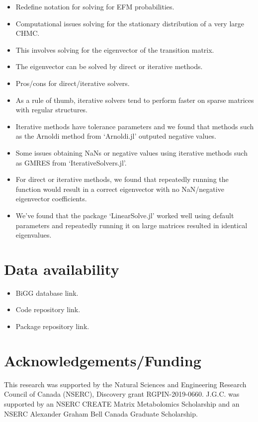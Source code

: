 \documentclass[11pt]{article}
\begin{document}
\begin{itemize}
    \item Redefine notation for solving for EFM probabilities.
    \item Computational issues solving for the stationary distribution of a very large CHMC.
    \item This involves solving for the eigenvector of the transition matrix.
    \item The eigenvector can be solved by direct or iterative methods.
    \item Pros/cons for direct/iterative solvers.
    \item As a rule of thumb, iterative solvers tend to perform faster on sparse matrices with regular structures.
    \item Iterative methods have tolerance parameters and we found that methods such as the Arnoldi method from `Arnoldi.jl' outputed negative values.
    \item Some issues obtaining NaNs or negative values using iterative methods such as GMRES from `IterativeSolvers.jl'.
    \item For direct or iterative methods, we found that repeatedly running the function would result in a correct eigenvector with no NaN/negative eigenvector coefficients.
    \item We've found that the package `LinearSolve.jl' worked well using default parameters and repeatedly running it on large matrices resulted in identical eigenvalues.
\end{itemize}

\section{Data availability}

\begin{itemize}
    \item BiGG database link.
    \item Code repository link.
    \item Package repository link.
\end{itemize}


\section{Acknowledgements/Funding}

This research was supported by the Natural Sciences and Engineering Research Council of Canada (NSERC), Discovery grant RGPIN-2019-0660. J.G.C. was supported by an NSERC CREATE Matrix Metabolomics Scholarship and an NSERC Alexander Graham Bell Canada Graduate Scholarship.
\end{document}
